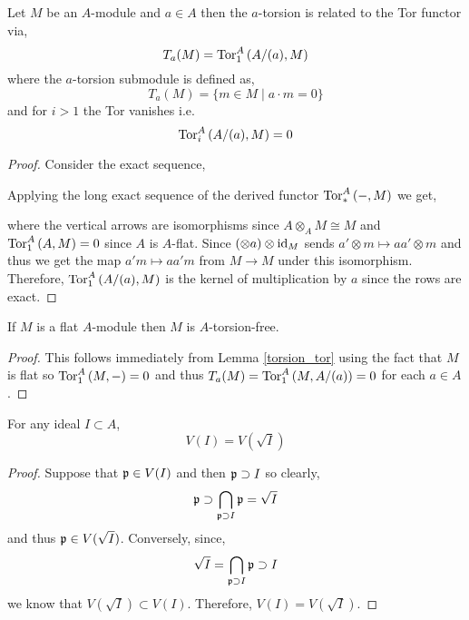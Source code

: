 \documentclass[12pt]{extarticle}
\begin{document}
\begin{lemma} \label{torsion_tor}
Let $M$ be an $A$-module and $a \in A$ then the $a$-torsion is related to the Tor functor via,
\[ T_a(M) = \mathrm{Tor}^{A}_{1} \left( A / (a), M \right) \]
where the $a$-torsion submodule is defined as, 
\[ T_a(M) = \{ m \in M \mid a \cdot m = 0 \} \]
and for $i > 1$ the Tor vanishes i.e.
\[ \mathrm{Tor}^{A}_{i} \left( A /(a), M \right) = 0 \]
\end{lemma}

\begin{proof}
Consider the exact sequence,
\begin{center}
\end{center}
Applying the long exact sequence of the derived functor $\mathrm{Tor}^{A}_{\ast} \left( -, M \right)$ we get,
\begin{center}
\end{center} 
where the vertical arrows are isomorphisms since $A \otimes_A M \cong M$ and $\mathrm{Tor}^{A}_{1} \left( A, M \right) = 0$ since $A$ is $A$-flat. Since $(\otimes a)\otimes \mathrm{id}_M$ sends $a' \otimes m \mapsto a a' \otimes m$ and thus we get the map $a' m \mapsto aa' m$ from $M \to M$ under this isomorphism. Therefore, $\mathrm{Tor}^{A}_{1} \left( A / (a), M \right)$ is the kernel of multiplication by $a$ since the rows are exact.  
\end{proof}

\begin{corollary} \label{torsion_free}
If $M$ is a flat $A$-module then $M$ is $A$-torsion-free.
\end{corollary}

\begin{proof}
This follows immediately from Lemma \ref{torsion_tor} using the fact that $M$ is flat so $\mathrm{Tor}^{A}_{1} \left( M, - \right) = 0$ and thus $T_a(M) = \mathrm{Tor}^{A}_{1} \left( M, A / (a) \right) = 0$ for each $a \in A$. 
\end{proof}


\begin{lemma} \label{radical_generates_same_set}
For any ideal $I \subset A$,
\[ V(I) = V(\sqrt{I}) \]
\end{lemma}

\begin{proof} 
Suppose that $\mathfrak{p} \in V(I)$ and then $\mathfrak{p} \supset I$ so clearly,
\[ \mathfrak{p} \supset \bigcap_{\mathfrak{p} \supset I} \mathfrak{p} = \sqrt{I} \]
and thus $\mathfrak{p} \in V(\sqrt{I})$. Conversely, since,
\[ \sqrt{I} = \bigcap_{\mathfrak{p} \supset I} \mathfrak{p} \supset I \]
we know that $V(\sqrt{I}) \subset V(I)$. Therefore, $V(I) = V(\sqrt{I})$. 
\end{proof}
\end{document}

